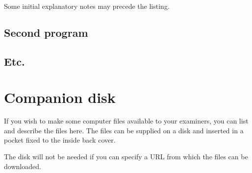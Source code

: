 \documentclass[12pt,openany,a4paper]{book}
\begin{document}
Some initial explanatory notes may precede the listing.

\section{Second program}

\section{Etc.}

\chapter{Companion disk}

If you wish to make some computer files available to your examiners,
you can list and describe the files here.  The files can be supplied
on a disk and inserted in a pocket fixed to the inside back cover.

The disk will not be needed if you can specify a URL from which the
files can be downloaded.

\cleardoublepage

\newpage
\nocite{*}


\end{document}
